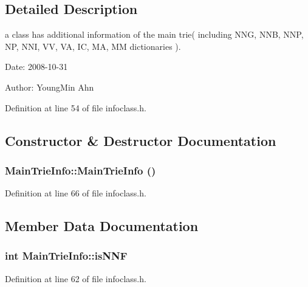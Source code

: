 \subsection{Detailed Description}
a class has additional information of the main trie( including NNG, NNB, NNP, NP, NNI, VV, VA, IC, MA, MM dictionaries ). 

\begin{Desc}
\item[Date:]2008-10-31 \end{Desc}
\begin{Desc}
\item[Author:]YoungMin Ahn \end{Desc}


Definition at line 54 of file infoclass.h.

\subsection{Constructor \& Destructor Documentation}
\hypertarget{classMainTrieInfo_c7e53d00899ba7f3b79a8adbae556154}{
\subsubsection[{MainTrieInfo}]{\setlength{\rightskip}{0pt plus 5cm}MainTrieInfo::MainTrieInfo ()}}
\label{classMainTrieInfo_c7e53d00899ba7f3b79a8adbae556154}




Definition at line 66 of file infoclass.h.

\subsection{Member Data Documentation}
\hypertarget{classMainTrieInfo_80cbea1df4fb2319d55089b1ea4b29f4}{
\subsubsection[{isNNF}]{\setlength{\rightskip}{0pt plus 5cm}int {\bf MainTrieInfo::isNNF}}}
\label{classMainTrieInfo_80cbea1df4fb2319d55089b1ea4b29f4}




Definition at line 62 of file infoclass.h.


